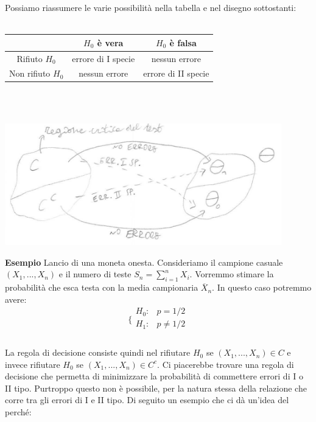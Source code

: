 Possiamo riassumere le varie possibilità nella tabella e nel disegno sottostanti:
\\
\\
\begin{tabular}{c|c|c}
 & $H_0$ è vera & $H_0$ è falsa \\ 
\hline 
Rifiuto $H_0$ & errore di I specie & nessun errore \\ 
\hline 
Non rifiuto $H_0$ & nessun errore & errore di II specie \\ 
\end{tabular} 
\\
\\
\begin{center}
\includegraphics [width=12cm] {immagini/grafico_1.jpg}
\end{center}

\noindent \textbf{Esempio} Lancio di una moneta onesta. Consideriamo il campione casuale $(X_1,...,X_n)$ e il numero di teste $S_n = \sum_{i=1}^n X_i$. Vorremmo stimare la probabilità che esca testa con la media campionaria $\overline{X}_n$. In questo caso potremmo avere:
\\
$$\bigg \{
\begin{array}{rl}
H_0: & p=1/2 \\
H_1: & p \neq 1/2 \\
\end{array}
$$
\\
La regola di decisione consiste quindi nel rifiutare $H_0$ se $(X_1,...,X_n) \in C$ e invece rifiutare $H_0$ se $(X_1,...,X_n) \in C^c$. Ci piacerebbe trovare una regola di decisione che permetta di minimizzare la probabilità di commettere errori di I o II tipo. Purtroppo questo non è possibile, per la natura stessa della relazione che corre tra gli errori di I e II tipo. Di seguito un esempio che ci dà un'idea del perché:\\

